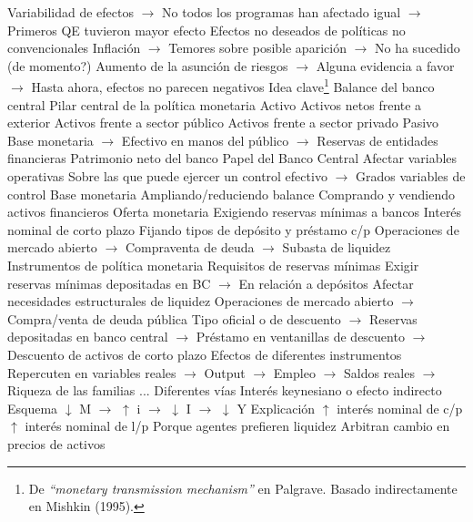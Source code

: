 \documentclass{nuevotema}
\begin{document}
\begin{esquemal}
				\4[] Variabilidad de efectos
				\4[] $\to$ No todos los programas han afectado igual
				\4[] $\to$ Primeros QE tuvieron mayor efecto
				\4 Efectos no deseados de políticas no convencionales
				\4[] Inflación
				\4[] $\to$ Temores sobre posible aparición
				\4[] $\to$ No ha sucedido (de momento?)
				\4[] Aumento de la asunción de riesgos
				\4[] $\to$ Alguna evidencia a favor
				\4[] $\to$ Hasta ahora, efectos no parecen negativos
	\1 
		\2 Idea clave\footnote{De \textit{``monetary transmission mechanism''} en Palgrave. Basado indirectamente en Mishkin (1995).}
			\3 Balance del banco central
				\4 Pilar central de la política monetaria
				\4 Activo
				\4[] Activos netos frente a exterior
				\4[] Activos frente a sector público
				\4[] Activos frente a sector privado
				\4 Pasivo
				\4[] Base monetaria
				\4[] $\to$ Efectivo en manos del público
				\4[] $\to$ Reservas de entidades financieras
				\4[] Patrimonio neto del banco
			\3 Papel del Banco Central
				\4 Afectar variables operativas
				\4[] Sobre las que puede ejercer un control efectivo
				\4[] $\to$ Grados variables de control
				\4 Base monetaria
				\4[] Ampliando/reduciendo balance
				\4[] Comprando y vendiendo activos financieros
				\4 Oferta monetaria
				\4[] Exigiendo reservas mínimas a bancos
				\4 Interés nominal de corto plazo
				\4[] Fijando tipos de depósito y préstamo c/p
				\4[] Operaciones de mercado abierto
				\4[] $\to$ Compraventa de deuda
				\4[] $\to$ Subasta de liquidez
			\3 Instrumentos de política monetaria
				\4 Requisitos de reservas mínimas
				\4[] Exigir reservas mínimas depositadas en BC
				\4[] $\to$ En relación a depósitos
				\4[] Afectar necesidades estructurales de liquidez
				\4 Operaciones de mercado abierto
				\4[] $\to$ Compra/venta de deuda pública
				\4 Tipo oficial o de descuento
				\4[] $\to$ Reservas depositadas en banco central
				\4[] $\to$ Préstamo en ventanillas de descuento
				\4[] $\to$ Descuento de activos de corto plazo
			\3 Efectos de diferentes instrumentos
				\4 Repercuten en variables reales
				\4[] $\to$ Output
				\4[] $\to$ Empleo
				\4[] $\to$ Saldos reales
				\4[] $\to$ Riqueza de las familias
				\4[] ...
				\4 Diferentes vías
		\2 Interés keynesiano o efecto indirecto
			\3 Esquema
				\4[] $\downarrow$ M $\to$ $\uparrow$ i $\to$ $\downarrow$ I $\to$ $\downarrow$ Y
			\3 Explicación
				\4 $\uparrow$ interés nominal de c/p
				\4[$\then$] $\uparrow$ interés nominal de l/p
				\4[] Porque agentes prefieren liquidez
				\4[] Arbitran cambio en precios de activos

\end{esquemal}
\end{document}
